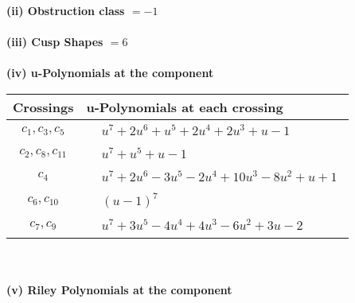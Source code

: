 \documentclass[1p]{elsarticle_modified}
\theoremstyle{definition}
\begin{document}
\flushleft \textbf{(ii) Obstruction class $= -1$}\\~\\
\flushleft \textbf{(iii) Cusp Shapes $= 6$}\\~\\
\newpage\renewcommand{\arraystretch}{1}
\flushleft \textbf{(iv) u-Polynomials at the component}\newline \\
\begin{tabular}{m{50pt}|m{274pt}}
Crossings & \hspace{64pt}u-Polynomials at each crossing \\
\hline $$\begin{aligned}c_{1},c_{3},c_{5}\end{aligned}$$&$\begin{aligned}
&u^7+2 u^6+u^5+2 u^4+2 u^3+u-1
\end{aligned}$\\
\hline $$\begin{aligned}c_{2},c_{8},c_{11}\end{aligned}$$&$\begin{aligned}
&u^7+u^5+u-1
\end{aligned}$\\
\hline $$\begin{aligned}c_{4}\end{aligned}$$&$\begin{aligned}
&u^7+2 u^6-3 u^5-2 u^4+10 u^3-8 u^2+u+1
\end{aligned}$\\
\hline $$\begin{aligned}c_{6},c_{10}\end{aligned}$$&$\begin{aligned}
&(u-1)^7
\end{aligned}$\\
\hline $$\begin{aligned}c_{7},c_{9}\end{aligned}$$&$\begin{aligned}
&u^7+3 u^5-4 u^4+4 u^3-6 u^2+3 u-2
\end{aligned}$\\
\hline
\end{tabular}\\~\\
\newpage\renewcommand{\arraystretch}{1}
\flushleft \textbf{(v) Riley Polynomials at the component}\newline \\
\end{document}
